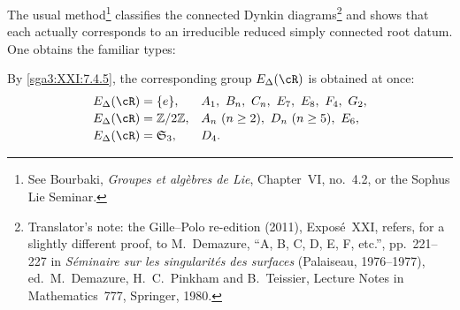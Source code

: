\begin{remark}\label{sga3:XXI:7.4.6}
The usual method\footnote{See Bourbaki, \emph{Groupes et algèbres
de Lie}, Chapter~VI, no.~4.2, or the Sophus Lie Seminar.}
classifies the connected Dynkin diagrams\footnote{Translator's note: the Gille--Polo re-edition (2011), Exposé~XXI, refers, for a
slightly different proof, to M.~Demazure, ``A, B, C, D, E, F, etc.'', pp.~221--227 in
\emph{Séminaire sur les singularités des surfaces} (Palaiseau, 1976--1977), ed.\
M.~Demazure, H.~C.~Pinkham and B.~Teissier, Lecture Notes in Mathematics~777,
Springer, 1980.} and shows that each
actually corresponds to an irreducible reduced simply connected
root datum.  One obtains the familiar types:
\begin{center}

\end{center}
By \ref{sga3:XXI:7.4.5}, the corresponding group
\(E_\Delta(\cR)\) is obtained at once:
\[
\begin{array}{ll}
E_\Delta(\cR)=\{e\},
 & A_1,\ B_n,\ C_n,\ E_7,\ E_8,\ F_4,\ G_2,\\[2pt]
E_\Delta(\cR)=\mathbb Z/2\mathbb Z,
 & A_n\ (n\geq2),\ D_n\ (n\geq5),\ E_6,\\[2pt]
E_\Delta(\cR)=\mathfrak S_3,
 & D_4.
\end{array}
\]
\end{remark}

